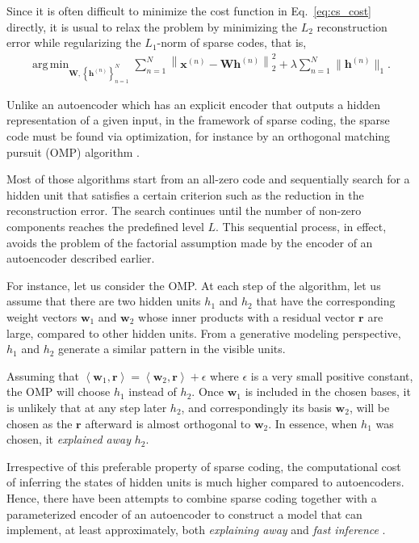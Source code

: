 \documentclass{now}
\newcommand{\vect}[1]{\mathbf{#1}}
\newcommand{\matr}[1]{\mathbf{#1}}
\newcommand{\vh}[0]{\vect{h}}
\newcommand{\vx}[0]{\vect{x}}
\newcommand{\vr}[0]{\vect{r}}
\newcommand{\vw}[0]{\vect{w}}
\newcommand{\mW}[0]{\matr{W}}
\DeclareMathOperator*{\argmin}{arg\,min}
\begin{document}
Since it is often difficult to minimize the cost function in
Eq.~\eqref{eq:cs_cost} directly, it is usual to relax the
problem by minimizing the $L_2$ reconstruction error while
regularizing the $L_1$-norm of sparse codes, that is,
\begin{align}
    \label{eq:sp_cost}
    \argmin_{\mW, \left\{ \vh^{(n)} \right\}_{n=1}^N }
    \sum_{n=1}^N \left\| \vx^{(n)} - \mW \vh^{(n)}
    \right\|_2^2 + \lambda \sum_{n=1}^N \| \vh^{(n)} \|_1.
\end{align}

Unlike an autoencoder which has an explicit encoder that
outputs a hidden representation of a given input, in the
framework of sparse coding, the sparse code must be found
via optimization, for instance by an orthogonal matching
pursuit (OMP) algorithm \citep{Davis1994}.

Most of those algorithms 
start from an all-zero
code and sequentially search for a hidden unit that
satisfies a certain criterion such as the reduction in the
reconstruction error. The search continues until the number
of non-zero components reaches the predefined level $L$.
This sequential process, in effect, avoids the problem of
the factorial assumption made by the encoder of an
autoencoder described earlier. 

For instance, let us consider the OMP. At each step of the
algorithm, let us assume that there are two hidden units
$h_1$ and $h_2$ that have the corresponding weight vectors
$\vw_1$ and $\vw_2$ whose inner products with a residual
vector $\vr$ are large, compared to other hidden units. From
a generative modeling perspective, $h_1$ and $h_2$ generate
a similar pattern in the visible units.

Assuming that $\left< \vw_1, \vr\right> = \left< \vw_2,
\vr\right> + \epsilon$ where $\epsilon$ is a very small
positive constant, the OMP will choose $h_1$ instead of $h_2$. Once
$\vw_1$ is included in the chosen bases, it is unlikely that
at any step later $h_2$, and correspondingly its basis
$\vw_2$, will be chosen as the $\vr$ afterward is almost
orthogonal to $\vw_2$. In essence, when $h_1$ was chosen, it
\textit{explained away} $h_2$.

Irrespective of this preferable property of sparse coding,
the computational cost of inferring the states of hidden
units is much higher compared to autoencoders. Hence, there
have been attempts to combine sparse coding together with a
parameterized encoder of an autoencoder to construct a model
that can implement, at least approximately, both
\textit{explaining away} and \textit{fast inference}
\citep[see, e.g.,][]{Kavukcuoglu2010,Gregor2010}.
\end{document}

